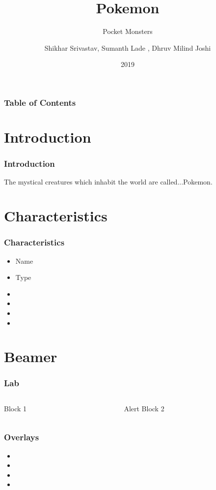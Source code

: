 \documentclass{beamer}
\title{Pokemon}
\subtitle{Pocket Monsters}
\author[Author 1, Author 2, Author 3]{Shikhar Srivastav\inst{1}, Sumanth Lade \inst{1}, Dhruv Milind Joshi\inst{2}}
\institute{MIT Manipal, JMIT}
\date{2019}
\begin{document}
\frame{\titlepage}
\begin{frame}
\frametitle{Table of Contents}
\tableofcontents
\end{frame}
\section{Introduction}
\begin{frame}
\frametitle{Introduction}
The mystical creatures which inhabit the world are called...\pause Pokemon.
\end{frame}
\section{Characteristics}
\begin{frame}
\frametitle{Characteristics}
\begin{itemize}
\item\visible Name\pause
\item<2>Type
\item{}
\item{}
\item{}
\item{}
\end{itemize}
\end{frame}
\section{Beamer}
\begin{frame}
\frametitle{Lab}
\begin{columns}
\begin{column}[]{0.5\textwidth}
\begin{block}{}
Block 1
\end{block}
\end{column}
\begin{column}[]{0.5\textwidth}
\begin{alertblock}{Alert}
Block 2
\end{alertblock}
\end{column}
\end{columns}
\end{frame}
\begin{frame}
\frametitle{Overlays}
\begin{itemize}
\item{}\pause
\item{}\pause
\item{}\pause
\item{}
\end{itemize}
\end{frame}
\end{document}
